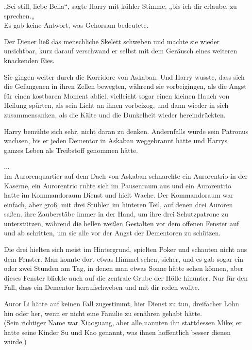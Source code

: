 {„Sei still, liebe Bella“, sagte Harry mit kühler Stimme, „bis ich dir erlaube, zu sprechen.„\\ Es gab keine Antwort, was Gehorsam bedeutete.

Der Diener ließ das menschliche Skelett schweben und machte sie wieder unsichtbar, kurz darauf verschwand er selbst mit dem Geräusch eines weiteren knackenden Eies.

Sie gingen weiter durch die Korridore von Askaban. Und Harry wusste, dass sich die Gefangenen in ihren Zellen bewegten, während sie vorbeigingen, als die Angst für einen kostbaren Moment abfiel, vielleicht sogar einen kleinen Hauch von Heilung spürten, als sein Licht an ihnen vorbeizog, und dann wieder in sich zusammensanken, als die Kälte und die Dunkelheit wieder hereindrückten.

Harry bemühte sich sehr, nicht daran zu denken. Andernfalls würde sein Patronus wachsen, bis er jeden Dementor in Askaban weggebrannt hätte und Harrys ganzes Leben als Treibstoff genommen hätte.

...\\ Im Aurorenquartier auf dem Dach von Askaban schnarchte ein Aurorentrio in der Kaserne, ein Aurorentrio ruhte sich im Pausenraum aus und ein Aurorentrio hatte im Kommandoraum Dienst und hielt Wache. Der Kommandoraum war einfach, aber groß, mit drei Stühlen im hinteren Teil, auf denen drei Auroren saßen, ihre Zauberstäbe immer in der Hand, um ihre drei Schutzpatrone zu unterstützen, während die hellen weißen Gestalten vor dem offenen Fenster auf und ab schritten, um sie alle vor der Angst der Dementoren zu schützen.

Die drei hielten sich meist im Hintergrund, spielten Poker und schauten nicht aus dem Fenster. Man konnte dort etwas Himmel sehen, sicher, und es gab sogar ein oder zwei Stunden am Tag, in denen man etwas Sonne hätte sehen können, aber dieses Fenster blickte auch auf die zentrale Grube der Hölle hinunter. Nur für den Fall, dass ein Dementor heraufschweben und mit dir reden wollte.

Auror Li hätte auf keinen Fall zugestimmt, hier Dienst zu tun, dreifacher Lohn hin oder her, wenn er nicht eine Familie zu ernähren gehabt hätte.\\ (Sein richtiger Name war Xiaoguang, aber alle nannten ihn stattdessen Mike; er hatte seine Kinder Su und Kao genannt, was ihnen hoffentlich besser dienen würde.)

}
